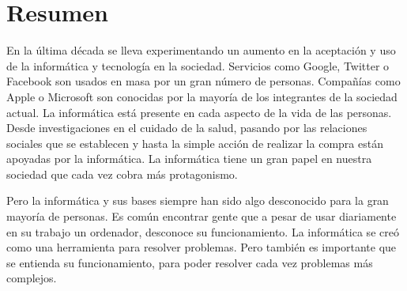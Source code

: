 

\setcounter{page}{3}








\chapter*{Resumen} %

En la última década se lleva experimentando un aumento en la aceptación y uso de la informática y tecnología en la sociedad. Servicios como Google, Twitter o Facebook son usados en masa por un gran número de personas. Compañías como Apple o Microsoft son conocidas por la mayoría de los integrantes de la sociedad actual. La informática está presente en cada aspecto de la vida de las personas. Desde investigaciones en el cuidado de la salud, pasando por las relaciones sociales que se establecen y hasta la simple acción de realizar la compra están apoyadas por la informática. La informática tiene un gran papel en nuestra sociedad que cada vez cobra más protagonismo. 

Pero la informática y sus bases siempre han sido algo desconocido para la gran mayoría de personas. Es común encontrar gente que a pesar de usar diariamente en su trabajo un ordenador, desconoce su funcionamiento. La informática se creó como una herramienta para resolver problemas. Pero también es importante que se entienda su funcionamiento, para poder resolver cada vez problemas más complejos.

